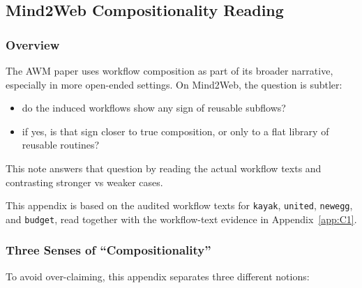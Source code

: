 \clearpage
\subsection{Mind2Web Compositionality Reading}\label{app:C5}

\subsubsection{Overview}

The AWM paper uses workflow composition as part of its broader
narrative, especially in more open-ended settings. On Mind2Web, the
question is subtler:

\begin{itemize}
\tightlist
\item
  do the induced workflows show any sign of reusable subflows?
\item
  if yes, is that sign closer to true composition, or only to a flat
  library of reusable routines?
\end{itemize}

This note answers that question by reading the actual workflow texts and
contrasting stronger vs weaker cases.

This appendix is based on the audited workflow texts for
\texttt{kayak}, \texttt{united}, \texttt{newegg}, and \texttt{budget},
read together with the workflow-text evidence in
Appendix~\ref{app:C1}.

\subsubsection{Three Senses of
``Compositionality''}

To avoid over-claiming, this appendix separates three different notions:

